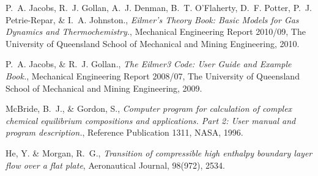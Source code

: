 \documentclass{AIAA}
\begin{document}
\begin{thebibliography}{}
P.~A. Jacobs, R.~J. Gollan, A.~J. Denman, B.~T. O'Flaherty, D.~F. Potter, P.~J. Petrie-Repar, \& I.~A. Johnston., {\it Eilmer's Theory Book: Basic Models for Gas Dynamics and Thermochemistry.}, Mechanical Engineering Report 2010/09, The University of Queensland School of Mechanical and Mining Engineering, 2010.

P.~A. Jacobs, \& R.~J. Gollan., {\it The Eilmer3 Code: User Guide and Example Book.}, Mechanical Engineering Report 2008/07, The University of Queensland School of Mechanical and Mining Engineering, 2009.

McBride, B.~J., \& Gordon, S., {\it Computer program for calculation of complex chemical equilibrium	compositions and applications. Part 2: User manual and program description.}, Reference Publication 1311, NASA, 1996.

He, Y. \& Morgan, R.~G., {\it Transition of compressible high enthalpy boundary layer
flow over a flat plate}, Aeronautical Journal, 98(972), 2534.



\end{thebibliography}
\end{document}
